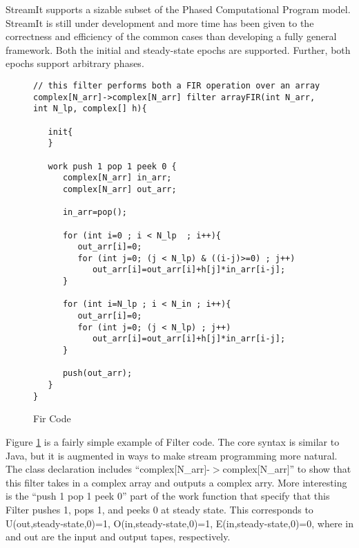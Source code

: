 StreamIt supports a sizable subset of the Phased Computational Program model. StreamIt is still under development and more time has been given to the correctness and efficiency of the common cases than developing a fully general framework. Both the initial and steady-state epochs are supported. Further, both epochs support arbitrary phases.
\begin{figure}[t]
\begin{verbatim}
// this filter performs both a FIR operation over an array	    
complex[N_arr]->complex[N_arr] filter arrayFIR(int N_arr, int N_lp, complex[] h){

   init{
   }    

   work push 1 pop 1 peek 0 {
      complex[N_arr] in_arr;
      complex[N_arr] out_arr;

      in_arr=pop();

      for (int i=0 ; i < N_lp  ; i++){
         out_arr[i]=0;
         for (int j=0; (j < N_lp) & ((i-j)>=0) ; j++)
            out_arr[i]=out_arr[i]+h[j]*in_arr[i-j];
      }
		
      for (int i=N_lp ; i < N_in ; i++){
         out_arr[i]=0;
         for (int j=0; (j < N_lp) ; j++)
            out_arr[i]=out_arr[i]+h[j]*in_arr[i-j];
      }

      push(out_arr);
   }
}
\end{verbatim}
\caption{Fir Code
\protect\label{fig:fir}}
\end{figure}

Figure \ref{fig:fir} is a fairly simple example of Filter code. The core syntax is similar to Java, but it is augmented in ways to make stream programming more natural. The class declaration includes ``complex$[$N\_arr$]$-$>$complex$[$N\_arr$]$'' to show that this filter takes in a complex array and outputs a complex arry. More interesting is the ``push 1 pop 1 peek 0'' part of the work function that specify that this Filter pushes 1, pops 1, and peeks 0 at steady state. This corresponds to U(out,steady-state,0)=1, O(in,steady-state,0)=1, E(in,steady-state,0)=0, where in and out are the input and output tapes, respectively.